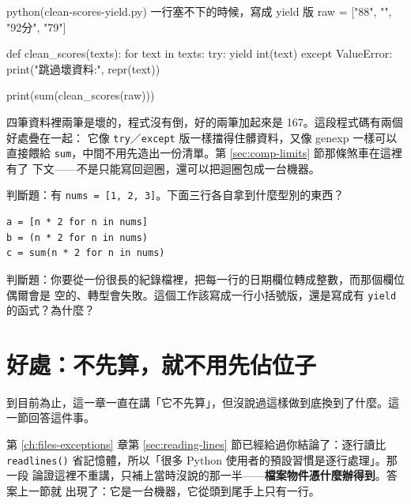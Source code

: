 \begin{example}{python}{(clean-scores-yield.py) 一行塞不下的時候，寫成 yield 版}
raw = ["88", "", "92分", "79"]


def clean_scores(texts):
    for text in texts:
        try:
            yield int(text)
        except ValueError:
            print("跳過壞資料:", repr(text))


print(sum(clean_scores(raw)))
\end{example}


四筆資料裡兩筆是壞的，程式沒有倒，好的兩筆加起來是 167。這段程式碼有兩個好處疊在一起：
它像 \texttt{try}／\texttt{except} 版一樣擋得住髒資料，又像 genexp 一樣可以直接餵給
\texttt{sum}，中間不用先造出一份清單。第 \ref{sec:comp-limits} 節那條煞車在這裡有了
下文——不是只能寫回迴圈，還可以把迴圈包成一台機器。


\begin{drills}[label=drills:generator-expression]
\item 判斷題：有 \texttt{nums = [1, 2, 3]}。下面三行各自拿到什麼型別的東西？
\begin{verbatim}
a = [n * 2 for n in nums]
b = (n * 2 for n in nums)
c = sum(n * 2 for n in nums)
\end{verbatim}
\item 判斷題：你要從一份很長的紀錄檔裡，把每一行的日期欄位轉成整數，而那個欄位偶爾會是
空的、轉型會失敗。這個工作該寫成一行小括號版，還是寫成有 \texttt{yield} 的函式？為什麼？
\end{drills}

\section{好處：不先算，就不用先佔位子}
\label{sec:lazy-memory}

到目前為止，這一章一直在講「它不先算」，但沒說過這樣做到底換到了什麼。這一節回答這件事。

第 \ref{ch:files-exceptions} 章第 \ref{sec:reading-lines} 節已經給過你結論了：逐行讀比
\texttt{readlines()} 省記憶體，所以「很多 Python 使用者的預設習慣是逐行處理」。那一段
論證這裡不重講，只補上當時沒說的那一半——\textbf{檔案物件憑什麼辦得到}。答案上一節就
出現了：它是一台機器，它從頭到尾手上只有一行。

